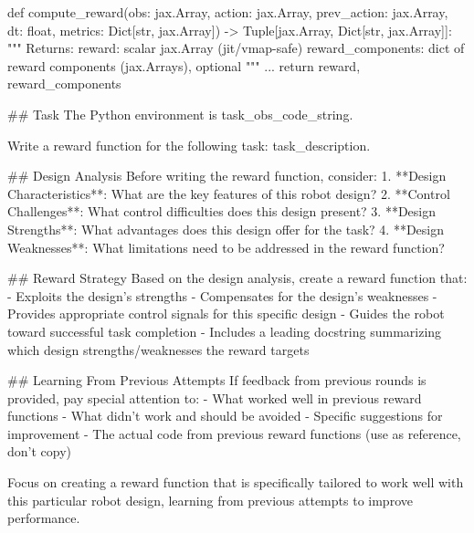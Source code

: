 \begin{promptbox}
def compute_reward(obs: jax.Array, action: jax.Array, prev_action: jax.Array, dt: float, metrics: Dict[str, jax.Array]) -> Tuple[jax.Array, Dict[str, jax.Array]]:
    """
    Returns:
      reward: scalar jax.Array (jit/vmap-safe)
      reward_components: dict of reward components (jax.Arrays), optional
    """
    ...
    return reward, reward_components
\end{promptbox}

\begin{promptbox}
## Task
The Python environment is {task_obs_code_string}. 

Write a reward function for the following task: {task_description}.

## Design Analysis
Before writing the reward function, consider:
1. **Design Characteristics**: What are the key features of this robot design?
2. **Control Challenges**: What control difficulties does this design present?
3. **Design Strengths**: What advantages does this design offer for the task?
4. **Design Weaknesses**: What limitations need to be addressed in the reward function?

## Reward Strategy
Based on the design analysis, create a reward function that:
- Exploits the design's strengths
- Compensates for the design's weaknesses  
- Provides appropriate control signals for this specific design
- Guides the robot toward successful task completion
- Includes a leading docstring summarizing which design strengths/weaknesses the reward targets

## Learning From Previous Attempts
If feedback from previous rounds is provided, pay special attention to:
- What worked well in previous reward functions
- What didn't work and should be avoided
- Specific suggestions for improvement
- The actual code from previous reward functions (use as reference, don't copy)

Focus on creating a reward function that is specifically tailored to work well with this particular robot design, learning from previous attempts to improve performance.
\end{promptbox}

